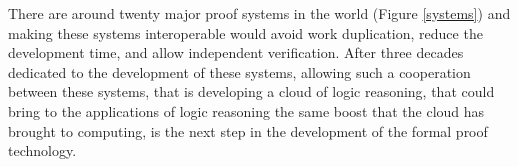 There are around twenty major proof systems in the world (Figure
\ref{systems}) and making these systems interoperable would avoid work
duplication, reduce the development time, and allow independent
verification.  After three decades dedicated to the development of
these systems, allowing such a cooperation between these systems, that
is developing a cloud of logic reasoning, that could bring to the
applications of logic reasoning the same boost that the cloud has
brought to computing, is the next step in the development of the
formal proof technology.

